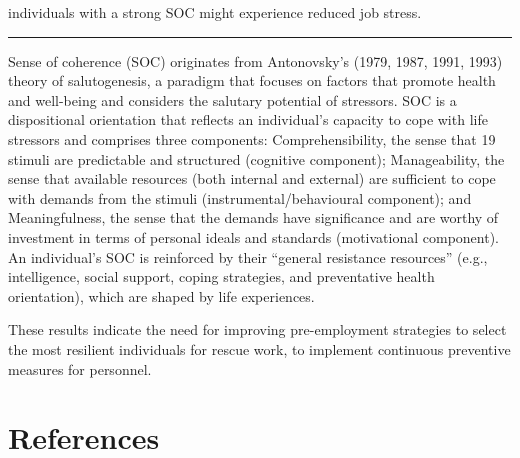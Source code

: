 \documentclass[
  man]{apa6}
\begin{document}
individuals with a strong SOC might experience reduced job stress.

\begin{center}\rule{0.5\linewidth}{0.5pt}\end{center}

Sense of coherence (SOC) originates from Antonovsky's (1979,
1987, 1991, 1993) theory of salutogenesis, a paradigm that focuses
on factors that promote health and well-being and considers the
salutary potential of stressors. SOC is a dispositional orientation that
reflects an individual's capacity to cope with life stressors and
comprises three components: Comprehensibility, the sense that
19
stimuli are predictable and structured (cognitive component);
Manageability, the sense that available resources (both internal and
external) are sufficient to cope with demands from the stimuli
(instrumental/behavioural component); and Meaningfulness, the
sense that the demands have significance and are worthy of
investment in terms of personal ideals and standards (motivational
component). An individual's SOC is reinforced by their ``general
resistance resources'' (e.g., intelligence, social support, coping
strategies, and preventative health orientation), which are shaped by
life experiences.

These results indicate the need for improving pre-employment strategies to select the most resilient individuals for rescue work, to implement continuous preventive measures for personnel.

\newpage

\hypertarget{references}{%
\section{References}\label{references}}
\end{document}
